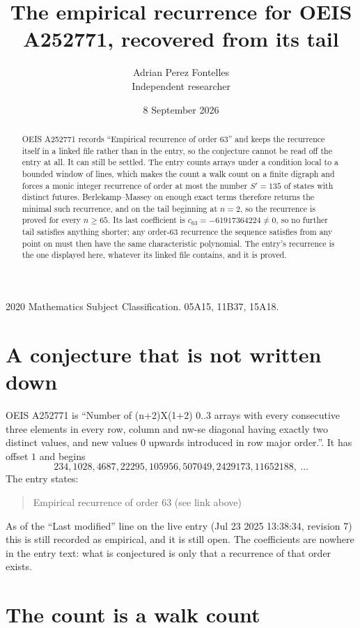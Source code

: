 \documentclass[11pt,a4paper]{article}
\title{The empirical recurrence for OEIS A252771, recovered from its tail}
\author{Adrian Perez Fontelles\\ \small Independent researcher}
\date{8 September 2026}
\theoremstyle{plain}
\theoremstyle{definition}
\begin{document}
\maketitle

\begin{abstract}
OEIS A252771 records ``Empirical recurrence of order $63$'' and keeps the recurrence itself in
a linked file rather than in the entry, so the conjecture cannot be read off the entry at all.
It can still be settled. The entry counts arrays under a condition local to a bounded window of
lines, which makes the count a walk count on a finite digraph and forces a monic integer
recurrence of order at most the number $S'=135$ of states with distinct futures. Berlekamp--Massey on
enough exact terms therefore returns the minimal such recurrence, and on the tail beginning at $n=2$, so the recurrence is proved for every $n\ge65$.
Its last coefficient is $c_{63}=-61917364224\neq0$, so no further tail satisfies anything
shorter; any order-$63$ recurrence the sequence satisfies from any point on must then have
the same characteristic polynomial. The entry's recurrence is the one displayed here, whatever
its linked file contains, and it is proved.
\end{abstract}

\noindent\small 2020 Mathematics Subject Classification. 05A15, 11B37, 15A18.\normalsize

\section{A conjecture that is not written down}

OEIS A252771 is ``Number of (n+2)X(1+2) 0..3 arrays with every consecutive three elements in every row, column and nw-se diagonal having exactly two distinct values, and new values 0 upwards introduced in row major order.''. It has offset $1$ and begins
\[
234, 1028, 4687, 22295, 105956, 507049, 2429173, 11652188,\ \dots
\]
The entry states:
\begin{quote}
Empirical recurrence of order 63 (see link above)
\end{quote}
As of the ``Last modified'' line on the live entry (Jul 23 2025 13:38:34, revision 7)
this is still recorded as empirical, and it is still open. The coefficients are nowhere in the
entry text: what is conjectured is only that a recurrence of that order exists.

\section{The count is a walk count}
\end{document}
